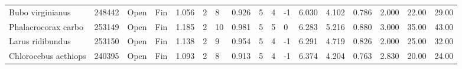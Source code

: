 \documentclass[10pt,a4paper]{amsart}
\theoremstyle{definition}
\theoremstyle{remark}
\numberwithin{equation}{section}
\begin{document}
\begin{table}[ht]
{\begin{tabular}{lllllllllllllllll}
Bubo virginianus & 248442 & Open & Fin & 1.056 & 2 & 8 & 0.926 & 5 & 4 & -1 & 6.030 & 4.102 & 0.786 & 2.000 & 22.00 & 29.00 \\
Phalacrocorax carbo & 253149 & Open & Fin & 1.185 & 2 & 10 & 0.981 & 5 & 5 & 0 & 6.283 & 5.216 & 0.880 & 3.000 & 35.00 & 43.00 \\
Larus ridibundus & 253150 & Open & Fin & 1.138 & 2 & 9 & 0.954 & 5 & 4 & -1 & 6.291 & 4.719 & 0.826 & 2.000 & 25.00 & 32.00 \\
Chlorocebus aethiops & 240395 & Open & Fin & 1.093 & 2 & 8 & 0.913 & 5 & 4 & -1 & 6.374 & 4.204 & 0.763 & 2.830 & 20.00 & 24.00 \\
\hline
\end{tabular}
}
\end{table}
\end{document}

